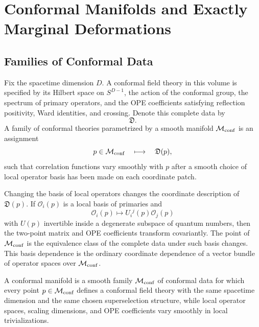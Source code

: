 \chapter{Conformal Manifolds and Exactly Marginal Deformations}
\label{ch:volume-iii-conformal-manifolds-exactly-marginal-deformations}

\section{Families of Conformal Data}

Fix the spacetime dimension \(D\).  A conformal field theory in this volume is
specified by its Hilbert space on \(S^{D-1}\), the action of the conformal
group, the spectrum of primary operators, and the OPE coefficients satisfying
reflection positivity, Ward identities, and crossing.  Denote this complete
data by
\[
  \mathfrak D.
\]
A family of conformal theories parametrized by a smooth manifold
\(\mathcal M_{\rm conf}\) is an assignment
\[
  p\in\mathcal M_{\rm conf}
  \quad\longmapsto\quad
  \mathfrak D(p),
\]
such that correlation functions vary smoothly with \(p\) after a smooth
choice of local operator basis has been made on each coordinate patch.

Changing the basis of local operators changes the coordinate description of
\(\mathfrak D(p)\).  If \(\mathcal O_i(p)\) is a local basis of primaries and
\[
  \mathcal O_i(p)\mapsto U_i{}^j(p)\mathcal O_j(p)
\]
with \(U(p)\) invertible inside a degenerate subspace of quantum numbers, then
the two-point matrix and OPE coefficients transform covariantly.  The point of
\(\mathcal M_{\rm conf}\) is the equivalence class of the complete data under
such basis changes.  This basis dependence is the ordinary coordinate
dependence of a vector bundle of operator spaces over \(\mathcal M_{\rm conf}\).

\begin{definition}
  A conformal manifold is a smooth family \(\mathcal M_{\rm conf}\) of
  conformal data for which every point \(p\in\mathcal M_{\rm conf}\) defines a
  conformal field theory with the same spacetime dimension and the same chosen
  superselection structure, while local operator spaces, scaling dimensions,
  and OPE coefficients vary smoothly in local trivializations.
\end{definition}

